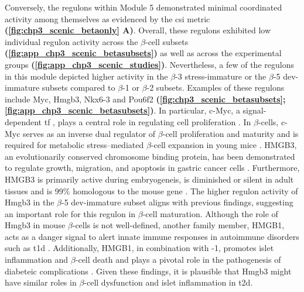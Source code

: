 \par Conversely, the regulons within Module 5 demonstrated minimal coordinated activity among themselves as evidenced by the \gls{csi} metric \textbf{(\autoref{fig:chp3_scenic_betaonly} A)}. Overall, these regulons exhibited low individual regulon activity across the $\beta$-cell subsets \textbf{(\autoref{fig:app_chp3_scenic_betasubsets})} as well as across the experimental groups \textbf{(\autoref{fig:app_chp3_scenic_studies})}. Nevertheless, a few of the regulons in this module depicted higher activity in the $\beta$-3 stress-immature or the $\beta$-5 dev-immature subsets compared to $\beta$-1 or $\beta$-2 subsets. Examples of these regulons include Myc, Hmgb3, Nkx6-3 and Pou6f2 \textbf{(\autoref{fig:chp3_scenic_betasubsets}; \autoref{fig:app_chp3_scenic_betasubsets})}. In particular, c-Myc, a signal-dependent \gls{tf} \textbf{\cite{wortham_transcriptional_2021}}, plays a central role in regulating cell proliferation \textbf{\cite{dang_c-myc_1999}}. In $\beta$-cells, c-Myc serves as an inverse dual regulator of $\beta$-cell proliferation and maturity \textbf{\cite{puri_replication_2018}} and is required for metabolic stress–mediated $\beta$-cell expansion in young mice \textbf{\cite{rosselot_myc_2019}}. HMGB3, an evolutionarily conserved chromosome binding protein, has been demonstrated to regulate growth, migration, and apoptosis in gastric cancer cells \textbf{\cite{guo_knockdown_2016}}. Furthermore, HMGB3 is primarily active during embryogeneis, is diminished or silent in adult tissues 
 and is 99\% homologous to the mouse gene \textbf{\cite{guo_knockdown_2016,nemeth_hmgb3_2003}}. The higher regulon activity of Hmgb3 in the $\beta$-5 dev-immature subset aligns with previous findings, suggesting an important role for this regulon in $\beta$-cell maturation. Although the role of Hmgb3 in mouse $\beta$-cells is not well-defined, another family member, HMGB1, acts as a danger signal to alert innate immune responses in autoimmune disorders such as \gls{t1d} \textbf{\cite{zhang_hmgb1_2010}}. Additionally, HMGB1, in combination with -1, promotes islet inflammation and $\beta$-cell death \textbf{\cite{steer_interleukin-1_2006}} and plays a pivotal role in the pathogenesis of diabeteic complications \textbf{\cite{biscetti_high_2019}}. Given these findings, it is plausible that Hmgb3 might have similar roles in $\beta$-cell dysfunction and islet inflammation in \gls{t2d}.\\


